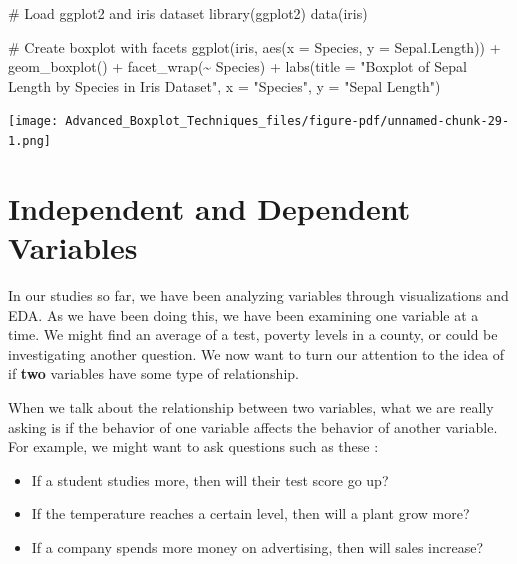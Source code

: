 \documentclass[
  letterpaper,
  DIV=11,
  numbers=noendperiod]{scrreprt}
\newenvironment{Shaded}{\begin{snugshade}}{\end{snugshade}}
\newcommand{\AttributeTok}[1]{\textcolor[rgb]{0.40,0.45,0.13}{#1}}
\newcommand{\CommentTok}[1]{\textcolor[rgb]{0.37,0.37,0.37}{#1}}
\newcommand{\FunctionTok}[1]{\textcolor[rgb]{0.28,0.35,0.67}{#1}}
\newcommand{\NormalTok}[1]{\textcolor[rgb]{0.00,0.23,0.31}{#1}}
\newcommand{\SpecialCharTok}[1]{\textcolor[rgb]{0.37,0.37,0.37}{#1}}
\newcommand{\StringTok}[1]{\textcolor[rgb]{0.13,0.47,0.30}{#1}}
\providecommand{\tightlist}{%
  \setlength{\itemsep}{0pt}\setlength{\parskip}{0pt}}\usepackage{longtable,booktabs,array}
\begin{document}
\begin{Shaded}
\begin{Highlighting}[]
\CommentTok{\# Load ggplot2 and iris dataset}
\FunctionTok{library}\NormalTok{(ggplot2)}
\FunctionTok{data}\NormalTok{(iris)}

\CommentTok{\# Create boxplot with facets}
\FunctionTok{ggplot}\NormalTok{(iris, }\FunctionTok{aes}\NormalTok{(}\AttributeTok{x =}\NormalTok{ Species, }\AttributeTok{y =}\NormalTok{ Sepal.Length)) }\SpecialCharTok{+}
  \FunctionTok{geom\_boxplot}\NormalTok{() }\SpecialCharTok{+}
  \FunctionTok{facet\_wrap}\NormalTok{(}\SpecialCharTok{\textasciitilde{}}\NormalTok{ Species) }\SpecialCharTok{+}
  \FunctionTok{labs}\NormalTok{(}\AttributeTok{title =} \StringTok{"Boxplot of Sepal Length by Species in Iris Dataset"}\NormalTok{, }\AttributeTok{x =} \StringTok{"Species"}\NormalTok{, }\AttributeTok{y =} \StringTok{"Sepal Length"}\NormalTok{)}
\end{Highlighting}
\end{Shaded}

\texttt{[image: Advanced\_Boxplot\_Techniques\_files/figure-pdf/unnamed-chunk-29-1.png]}


\chapter*{Independent and Dependent
Variables}\label{independent-and-dependent-variables}


In our studies so far, we have been analyzing variables through
visualizations and EDA. As we have been doing this, we have been
examining one variable at a time. We might find an average of a test,
poverty levels in a county, or could be investigating another question.
We now want to turn our attention to the idea of if \textbf{two}
variables have some type of relationship.

When we talk about the relationship between two variables, what we are
really asking is if the behavior of one variable affects the behavior of
another variable. For example, we might want to ask questions such as
these :

\begin{itemize}
\tightlist
\item
  If a student studies more, then will their test score go up?
\item
  If the temperature reaches a certain level, then will a plant grow
  more?
\item
  If a company spends more money on advertising, then will sales
  increase?
\end{itemize}
\end{document}
